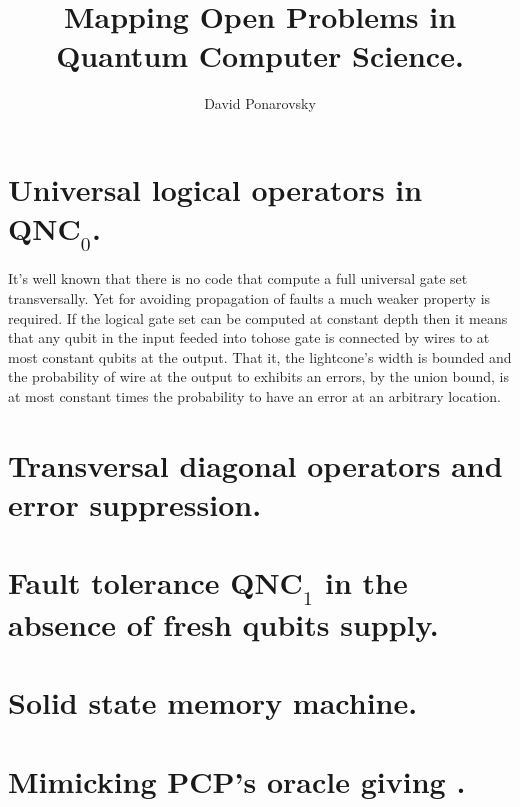 \documentclass[manuscript,screen,review]{acmart}
\begin{document}

\title{ Mapping Open Problems in Quantum Computer Science.}
\author{David Ponarovsky}
\maketitle

\newcommand*{\Mbas}{\mathcal{X}^\prime}
\newcommand*{\bas}{\mathcal{X}}
\newcommand*{\sMbas}{\Mbas}
\newcommand*{\QQ}{C_{X}/C_{Z}^\perp }
\newcommand*{\trig}{ Triorthogonal }
\newcommand*{\Hyp}{ Hyperproduct }
\newcommand*{\Cin}{ C_{\text{initial}} }
\newcommand*{\Ctan}{ C_{\text{Tan}} }

\section{Universal logical operators in $\textbf{QNC}_{0}$.  }
It's well known that there is no code that compute a full universal gate set transversally. Yet for avoiding propagation of faults a much weaker property is required. If the logical gate set can be computed at constant depth then it means that any qubit in the input feeded into tohose gate is connected by wires to at most constant qubits at the output. That it, the lightcone's width is bounded and the probability of wire at the output to exhibits an errors, by the union bound, is at most constant times the probability to have an error at an arbitrary location.
\section{Transversal diagonal operators and error suppression.  }
\section{Fault tolerance $\textbf{QNC}_{1}$ in the absence of fresh qubits supply.  }
\section{Solid state memory machine.}
\section{Mimicking PCP's oracle giving .}
\printbibliography
\end{document}
